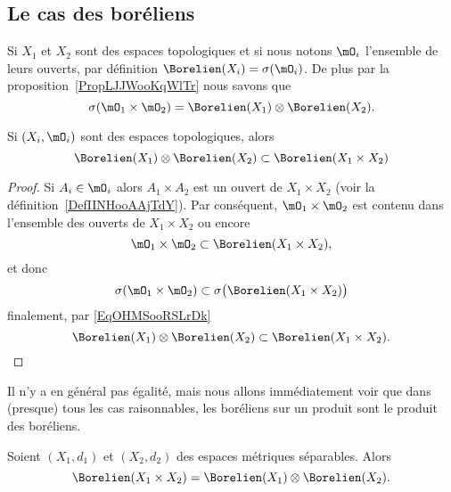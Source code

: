 \subsection{Le cas des boréliens}

Si \( X_1\) et  \( X_2\) sont des espaces topologiques et si nous notons \( \mO_i\) l'ensemble de leurs ouverts, par définition \( \Borelien(X_i)=\sigma(\mO_i)\). De plus par la proposition~\ref{PropLJJWooKqWlTr} nous savons que
\begin{equation}        \label{EqOHMSooRSLrDk}
	\sigma(\mO_1\times \mO_2)=\Borelien(X_1)\otimes \Borelien(X_2).
\end{equation}

\begin{lemma}       \label{LemDEDQooJyzXgC}
	Si \( (X_i,\mO_i)\) sont des espaces topologiques, alors
	\begin{equation}
		\Borelien(X_1)\otimes \Borelien(X_2)\subset \Borelien(X_1\times X_2)
	\end{equation}
\end{lemma}

\begin{proof}
	Si \( A_i\in \mO_i\) alors \( A_1\times A_2\) est un ouvert de \( X_1\times X_2\) (voir la définition~\ref{DefIINHooAAjTdY}). Par conséquent, \( \mO_1\times \mO_2\) est contenu dans l'ensemble des ouverts de \( X_1\times X_2\) ou encore
	\begin{equation}
		\mO_1\times \mO_2\subset\Borelien(X_1\times X_2),
	\end{equation}
	et donc
	\begin{equation}
		\sigma(\mO_1\times \mO_2)\subset\sigma\big( \Borelien(X_1\times X_2) \big)
	\end{equation}
	finalement, par \eqref{EqOHMSooRSLrDk}
	\begin{equation}
		\Borelien(X_1)\otimes\Borelien(X_2)\subset\Borelien(X_1\times X_2).
	\end{equation}
\end{proof}

Il n'y a en général pas égalité, mais nous allons immédiatement voir que dans (presque) tous les cas raisonnables, les boréliens sur un produit sont le produit des boréliens.

\begin{proposition}        \label{PropNAAJooBPbjkX}
	Soient \( (X_1,d_1)\) et \( (X_2,d_2)\) des espaces métriques séparables. Alors
	\begin{equation}
		\Borelien(X_1\times X_2)=\Borelien(X_1)\otimes \Borelien(X_2).
	\end{equation}
\end{proposition}

